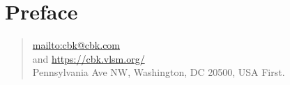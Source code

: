 
\pagebreak

\chapter{Preface}
\lipsum[1-2]

\begin{verse} 
\begin{small} 
\noindent%
\authora{ }\url{mailto:cbk@cbk.com} \\
\noindent%
and \authorb{ }\url{https://cbk.vlsm.org/} \\
 Pennsylvania Ave NW, Washington, DC 20500, USA First.\\
\end{small} 
\end{verse} 
\clearpage

\tableofcontents
\clearpage

\listoffigures
\clearpage

\listoftables
\clearpage

\enlargethispage{\baselineskip}
\mainmatter
{}

